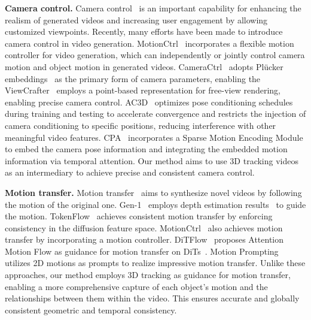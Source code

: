 \textbf{Camera control.}
Camera control~\cite{wang2024motionctrl,he2024cameractrl,zheng2024cami2v,yu2024viewcrafter,bahmani2024ac3d,yang2024direct,xiao2024trajectory,geng2024motion,wang2024cpa} is an important capability for enhancing the realism of generated videos and increasing user engagement by allowing customized viewpoints. Recently, many efforts have been made to introduce camera control in video generation. MotionCtrl~\cite{wang2024motionctrl} incorporates a flexible motion controller for video generation, which can independently or jointly control camera motion and object motion in generated videos. CameraCtrl~\cite{he2024cameractrl} adopts Plücker embeddings~\cite{sitzmann2021light} as the primary form of camera parameters, enabling the ViewCrafter~\cite{yu2024viewcrafter} employs a point-based representation for free-view rendering, enabling precise camera control. AC3D~\cite{bahmani2024ac3d} optimizes pose conditioning schedules during training and testing to accelerate convergence and restricts the injection of camera conditioning to specific positions, reducing interference with other meaningful video features. %
CPA~\cite{wang2024cpa} incorporates a Sparse Motion Encoding Module to embed the camera pose information and integrating the embedded motion information via temporal attention.
Our method aims to use 3D tracking videos as an intermediary to achieve precise and consistent camera control.

\textbf{Motion transfer.}
Motion transfer~\cite{esser2023structure,geyer2023tokenflow,pondaven2024video,wang2024motionctrl,wang2024videocomposer,park2024spectral,yatim2024space,meral2024motionflow,geng2024motion} aims to synthesize novel videos by following the motion of the original one. Gen-1~\cite{esser2023structure} employs depth estimation results~\cite{ranftl2020towards, bochkovskii2024depth, lu2024align3r} to guide the motion. TokenFlow~\cite{geyer2023tokenflow} achieves consistent motion transfer by enforcing consistency in the diffusion feature space. MotionCtrl~\cite{wang2024motionctrl} also achieves motion transfer by incorporating a motion controller. DiTFlow~\cite{pondaven2024video} proposes Attention Motion Flow as guidance for motion transfer on DiTs~\cite{peebles2023scalable}. Motion Prompting~\cite{geng2024motion} utilizes 2D motions as prompts to realize impressive motion transfer. Unlike these approaches, our method employs 3D tracking as guidance for motion transfer, enabling a more comprehensive capture of each object's motion and the relationships between them within the video. This ensures accurate and globally consistent geometric and temporal consistency.


